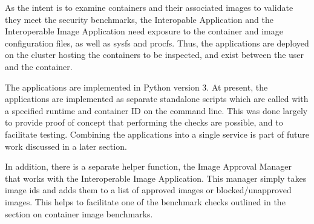 As the intent is to examine containers and their associated images to validate they meet the security benchmarks, the Interopable Application and the Interoperable Image Application need exposure to the container and image configuration files, as well as sysfs and procfs. Thus, the applications are deployed on the cluster hosting the containers to be inspected, and exist between the user and the container.

The applications are implemented in Python version 3. At present, the applications are implemented as separate standalone scripts which are called with a specified runtime and container ID on the command line. This was done largely to provide proof of concept that performing the checks are possible, and to facilitate testing. Combining the applications into a single service is part of future work discussed in a later section.

In addition, there is a separate helper function, the Image Approval Manager that works with the Interoperable Image Application. This manager simply takes image ids and adds them to a list of approved images or blocked/unapproved images. This helps to facilitate one of the benchmark checks outlined in the section on container image benchmarks. 
